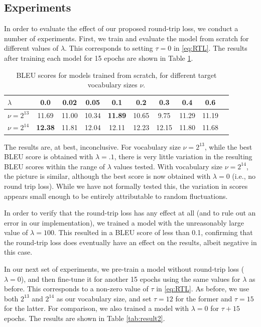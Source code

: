 \documentclass[11pt,a4paper]{article}
\begin{document}
\subsection{Experiments}
In order to evaluate the effect of our proposed round-trip loss, we conduct a number of experiments. First, we train and evaluate the model from scratch for different values of $\lambda$. This corresponds to setting $\tau=0$ in \eqref{eq:RTL}. The results after training each model for 15 epochs are shown in Table \ref{tab:result1}.

\begin{table} [ht]
\centering
\small
\begin{tabular}{ l || c | c | c | c | c | c | c | c | c  }
  $\lambda$ & 0.0 & 0.02 & 0.05 & 0.1 & 0.2 & 0.3 & 0.4 &  0.6 \\ \hline
  $\nu=2^{13}$ & 11.69 & 11.00 & 10.34 & \textbf{11.89} & 10.65 & 9.75 & 11.29 &  11.19 \\
  $\nu=2^{14}$ & \textbf{12.38} & 11.81 & 12.04 & 12.11 & 12.23 & 12.15 & 11.80 &  11.68 \\
\end{tabular}
\caption{BLEU scores for models trained from scratch, for different target vocabulary sizes $\nu$.}
\label{tab:result1}
\end{table}

The results are, at best, inconclusive. For vocabulary size $\nu=2^{13}$, while the best BLEU score is obtained with $\lambda=.1$, there is very little variation in the resulting BLEU scores within the range of $\lambda$ values tested. With vocabulary size $\nu=2^{14}$, the picture is similar, although the best score is now obtained with $\lambda=0$ (i.e., no round trip loss). While we have not formally tested this, the variation in scores appears small enough to be entirely attributable to random fluctuations. 

In order to verify that the round-trip loss has any effect at all (and to rule out an error in our implementation), we trained a model with the unreasonably large value of $\lambda=100$. This resulted in a BLEU score of less than 0.1, confirming that the round-trip loss does eventually have an effect on the results, albeit negative in this case.

In our next set of experiments, we pre-train a model without round-trip loss ($\lambda=0$), and then fine-tune it for another 15 epochs using the same values for $\lambda$ as before. This corresponds to a non-zero value of $\tau$ in \eqref{eq:RTL}. As before, we use both $2^{13}$ and $2^{14}$ as our vocabulary size, and set $\tau=12$ for the former and $\tau=15$ for the latter. For comparison, we also trained a model with $\lambda=0$ for $\tau+15$ epochs. The results are shown in Table \ref{tab:result2}.
\end{document}
